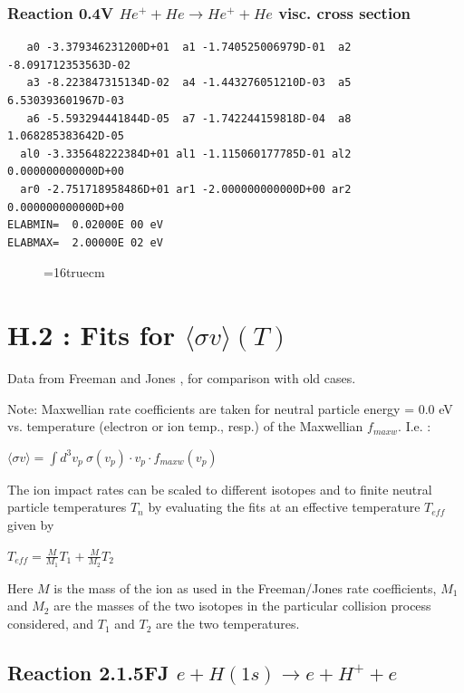 \documentclass[12pt,dvips]{article}
\begin{document}
\subsubsection{
Reaction 0.4V   $  He^+ + He \rightarrow He^+ + He $  visc. cross section
}



\begin{small}\begin{verbatim}
   a0 -3.379346231200D+01  a1 -1.740525006979D-01  a2 -8.091712353563D-02
   a3 -8.223847315134D-02  a4 -1.443276051210D-03  a5  6.530393601967D-03
   a6 -5.593294441844D-05  a7 -1.742244159818D-04  a8  1.068285383642D-05
  al0 -3.335648222384D+01 al1 -1.115060177785D-01 al2  0.000000000000D+00
  ar0 -2.751718958486D+01 ar1 -2.000000000000D+00 ar2  0.000000000000D+00
ELABMIN=  0.02000E 00 eV
ELABMAX=  2.00000E 02 eV
\end{verbatim}\end{small}


\begin{figure} \label{0.4}
\epsfxsize=16truecm
\end{figure}
\newpage
\section{H.2 : Fits for $\langle\sigma v \rangle (T)$} \label{sect2}

\bigskip
Data from Freeman and Jones \cite{kn:Freeman},
for comparison with old cases.

Note: Maxwellian rate coefficients are taken for neutral particle energy = 0.0 eV
vs. temperature (electron or ion temp., resp.) of the Maxwellian $f_{maxw}$.
I.e. :

$\langle\sigma v \rangle = \int d^3v_p \ \sigma(v_{p}) \cdot v_{p} \cdot
f_{maxw}(v_{p})$

The ion impact rates can be scaled to different isotopes and to finite
neutral particle temperatures $T_n$ by evaluating the fits at an
effective temperature $T_{eff}$ given by

$T_{eff} = \frac {M}{M_1} T_1 + \frac{M}{M_2} T_2 $

Here $M$ is the mass of the ion as used in the Freeman/Jones rate coefficients,
$M_1$ and $M_2$ are the masses of the two isotopes in the particular collision
process considered, and $T_1$ and $T_2$ are the two temperatures.

\bigskip

\subsection{
Reaction 2.1.5FJ  $e + H (1s) \rightarrow e + H^+ + e$
}
\end{document}
